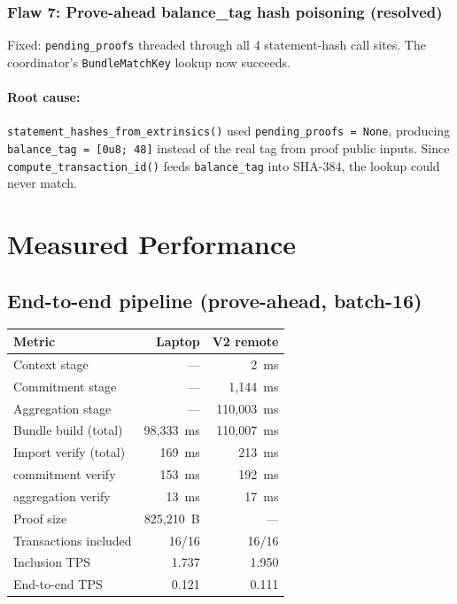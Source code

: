\documentclass[11pt]{article}
\begin{document}
\subsubsection{Flaw 7: Prove-ahead balance\_tag hash poisoning (resolved)}

Fixed: \texttt{pending\_proofs} threaded through all 4 statement-hash call
sites. The coordinator's \texttt{BundleMatchKey} lookup now succeeds.

\paragraph{Root cause:} \texttt{statement\_hashes\_from\_extrinsics()} used
\texttt{pending\_proofs = None}, producing \texttt{balance\_tag = [0u8; 48]}
instead of the real tag from proof public inputs. Since
\texttt{compute\_transaction\_id()} feeds \texttt{balance\_tag} into SHA-384,
the lookup could never match.

\section{Measured Performance}

\subsection{End-to-end pipeline (prove-ahead, batch-16)}

\begin{center}
\begin{tabular}{@{}lrr@{}}
\toprule
\textbf{Metric} & \textbf{Laptop} & \textbf{V2 remote} \\
\midrule
Context stage & --- & 2~ms \\
Commitment stage & --- & 1{,}144~ms \\
Aggregation stage & --- & 110{,}003~ms \\
Bundle build (total) & 98{,}333~ms & 110{,}007~ms \\
Import verify (total) & 169~ms & 213~ms \\
\quad commitment verify & 153~ms & 192~ms \\
\quad aggregation verify & 13~ms & 17~ms \\
Proof size & 825{,}210~B & --- \\
Transactions included & 16/16 & 16/16 \\
Inclusion TPS & 1.737 & 1.950 \\
End-to-end TPS & 0.121 & 0.111 \\
\bottomrule
\end{tabular}
\end{center}
\end{document}
